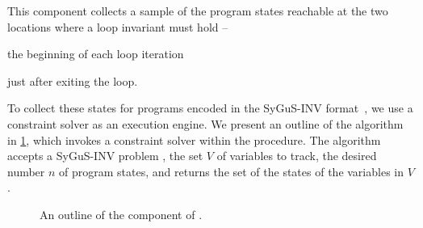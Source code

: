 \documentclass[conference]{IEEEtran}
\begin{document}
\noindent
This component collects a sample of the program states reachable at the two locations where a loop invariant must hold --
\begin{andlist}
    \item the beginning of each loop iteration
    \item just after exiting the loop.
\end{andlist}
To collect these states for programs encoded in the SyGuS-INV format~\cite{Alur2016SyGuSComp2R},
we use a constraint solver as an execution engine.
We present an outline of the \Record algorithm in \cref{algo:record},
which invokes a constraint solver within the \GetModel procedure.
The algorithm accepts a SyGuS-INV problem \SyGuSINVTriplet,
the set $V$ of variables to track, the desired number $n$ of program states,
and returns the set \States of the states of the variables in $V$.




\begin{figure}[!t]
    \caption{An outline of the \Record component of \LoopInvGen.}
    \label{algo:record}
\end{figure}
\end{document}
